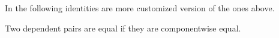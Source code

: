 \begin{code}%
\>[0]\AgdaSpace{}%
\AgdaSymbol{:}\AgdaSpace{}%
\AgdaSpace{}%
\AgdaSymbol{\{}\AgdaSpace{}%
\AgdaSpace{}%
\AgdaSymbol{\}}\AgdaSpace{}%
\AgdaSymbol{\{}\AgdaSpace{}%
\AgdaSymbol{:}\AgdaSpace{}%
\AgdaSpace{}%
\AgdaSymbol{\}}\AgdaSpace{}%
\AgdaSymbol{\{}\AgdaSpace{}%
\AgdaSymbol{:}\AgdaSpace{}%
\AgdaSpace{}%
\AgdaSpace{}%
\AgdaSpace{}%
\AgdaSymbol{\}}\AgdaSpace{}%
\AgdaSymbol{\{}\AgdaSpace{}%
\AgdaSymbol{:}\AgdaSpace{}%
\AgdaSpace{}%
\AgdaSpace{}%
\AgdaSpace{}%
\AgdaSymbol{\}}\<%
\\
\>[0][@{}l@{\AgdaIndent{0}}]%
\>[1]\AgdaSpace{}%
%
\>[4]\AgdaSpace{}%
\AgdaSpace{}%
\AgdaSymbol{(}\AgdaSpace{}%
\AgdaSpace{}%
\AgdaSpace{}%
\AgdaSpace{}%
\AgdaSpace{}%
\AgdaSpace{}%
\AgdaSpace{}%
\AgdaSymbol{)}\AgdaSpace{}%
\AgdaSpace{}%
\AgdaSpace{}%
\AgdaSpace{}%
\AgdaSpace{}%
\AgdaSpace{}%
\AgdaSpace{}%
\AgdaSpace{}%
\<%
\\
\>[0]\AgdaSpace{}%
\AgdaSpace{}%
\AgdaSymbol{=}\AgdaSpace{}%
\AgdaSpace{}%
\AgdaSpace{}%
\<%
\end{code}

In the following identities are more customized version of the ones above.

\begin{code}%
\>[0]\AgdaSpace{}%
\AgdaSpace{}%
\AgdaSymbol{\{}\AgdaSpace{}%
\AgdaSymbol{\}}\AgdaSpace{}%
\AgdaSymbol{\{}\AgdaSpace{}%
\AgdaSymbol{:}\AgdaSpace{}%
\AgdaSpace{}%
\AgdaSymbol{\}}\AgdaSpace{}%
\AgdaSymbol{\{}\AgdaSpace{}%
\AgdaSymbol{:}\AgdaSpace{}%
\AgdaSpace{}%
\AgdaSpace{}%
\AgdaSpace{}%
\AgdaSymbol{\}}\AgdaSpace{}%
\<%
\end{code}

Two dependent pairs are equal if they are componentwise equal.

